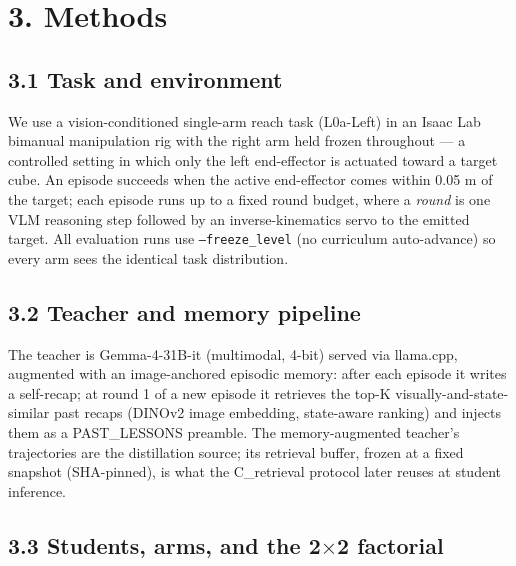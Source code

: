 

\section*{3. Methods}

\subsection*{3.1 Task and environment}

We use a vision-conditioned single-arm reach task (L0a-Left) in an
Isaac Lab bimanual manipulation rig with the right arm held frozen
throughout --- a controlled setting in which only the left end-effector
is actuated toward a target cube. An episode succeeds when the active
end-effector comes within 0.05 m of the target; each episode runs up
to a fixed round budget, where a \emph{round} is one VLM reasoning step
followed by an inverse-kinematics servo to the emitted target. All
evaluation runs use \texttt{--freeze\_level} (no curriculum auto-advance) so
every arm sees the identical task distribution.

\subsection*{3.2 Teacher and memory pipeline}

The teacher is Gemma-4-31B-it (multimodal, 4-bit) served via llama.cpp,
augmented with an image-anchored episodic memory: after each episode it
writes a self-recap; at round 1 of a new episode it retrieves the
top-K visually-and-state-similar past recaps (DINOv2 image embedding,
state-aware ranking) and injects them as a PAST\_LESSONS preamble. The
memory-augmented teacher's trajectories are the distillation source;
its retrieval buffer, frozen at a fixed snapshot (SHA-pinned), is what
the C\_retrieval protocol later reuses at student inference.

\subsection*{3.3 Students, arms, and the 2$\times$2 factorial}

